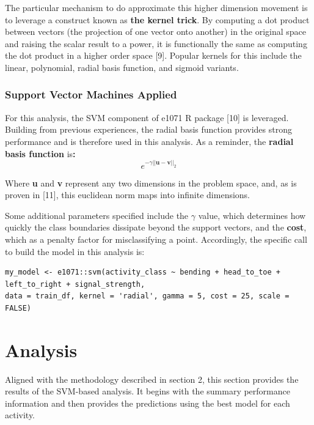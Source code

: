 \documentclass[
]{article}
\begin{document}
The particular mechanism to do approximate this higher dimension
movement is to leverage a construct known as \textbf{the kernel trick}.
By computing a dot product between vectors (the projection of one vector
onto another) in the original space and raising the scalar result to a
power, it is functionally the same as computing the dot product in a
higher order space {[}9{]}. Popular kernels for this include the linear,
polynomial, radial basis function, and sigmoid variants.

\subsubsection{Support Vector Machines
Applied}\label{support-vector-machines-applied}

For this analysis, the SVM component of e1071 R package {[}10{]} is
leveraged. Building from previous experiences, the radial basis function
provides strong performance and is therefore used in this analysis. As a
reminder, the \textbf{radial basis function} is\textbf{:} \[
e ^ { -\gamma || \boldsymbol{u} - \boldsymbol{v}||_2} 
\]

Where \textbf{u} and \textbf{v} represent any two dimensions in the
problem space, and, as is proven in {[}11{]}, this euclidean norm maps
into infinite dimensions.

Some additional parameters specified include the \(\gamma\) value, which
determines how quickly the class boundaries dissipate beyond the support
vectors, and the \textbf{cost}, which as a penalty factor for
misclassifying a point. Accordingly, the specific call to build the
model in this analysis is:

\begin{verbatim}
my_model <- e1071::svm(activity_class ~ bending + head_to_toe + left_to_right + signal_strength, 
data = train_df, kernel = 'radial', gamma = 5, cost = 25, scale = FALSE)
\end{verbatim}

\newpage

\section{Analysis}\label{analysis}

Aligned with the methodology described in section 2, this section
provides the results of the SVM-based analysis. It begins with the
summary performance information and then provides the predictions using
the best model for each activity.
\end{document}
